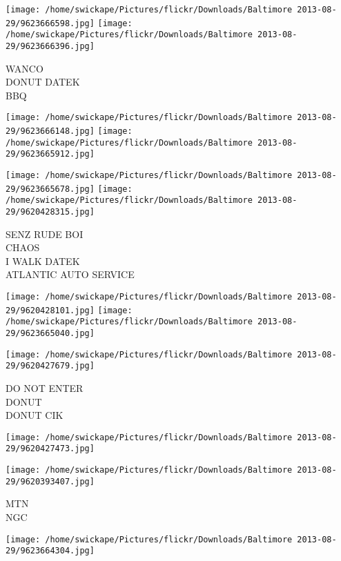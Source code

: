 \documentclass[10pt,letterpaper]{article}
\begin{document}
\vspace{0.25in}
\texttt{[image: /home/swickape/Pictures/flickr/Downloads/Baltimore 2013-08-29/9623666598.jpg]}
\texttt{[image: /home/swickape/Pictures/flickr/Downloads/Baltimore 2013-08-29/9623666396.jpg]}

WANCO\\
DONUT DATEK\\
BBQ\\
\pagebreak

\texttt{[image: /home/swickape/Pictures/flickr/Downloads/Baltimore 2013-08-29/9623666148.jpg]}
\texttt{[image: /home/swickape/Pictures/flickr/Downloads/Baltimore 2013-08-29/9623665912.jpg]}

\texttt{[image: /home/swickape/Pictures/flickr/Downloads/Baltimore 2013-08-29/9623665678.jpg]}
\texttt{[image: /home/swickape/Pictures/flickr/Downloads/Baltimore 2013-08-29/9620428315.jpg]}

SENZ RUDE BOI\\
CHAOS\\
I WALK  DATEK\\
ATLANTIC AUTO SERVICE\\
\pagebreak

\texttt{[image: /home/swickape/Pictures/flickr/Downloads/Baltimore 2013-08-29/9620428101.jpg]}
\texttt{[image: /home/swickape/Pictures/flickr/Downloads/Baltimore 2013-08-29/9623665040.jpg]}

\texttt{[image: /home/swickape/Pictures/flickr/Downloads/Baltimore 2013-08-29/9620427679.jpg]}

DO NOT ENTER\\
DONUT\\
DONUT CIK\\
\pagebreak

\texttt{[image: /home/swickape/Pictures/flickr/Downloads/Baltimore 2013-08-29/9620427473.jpg]}

\vspace{0.25in}
\texttt{[image: /home/swickape/Pictures/flickr/Downloads/Baltimore 2013-08-29/9620393407.jpg]}

MTN\\
NGC\\
\pagebreak

\texttt{[image: /home/swickape/Pictures/flickr/Downloads/Baltimore 2013-08-29/9623664304.jpg]}
\end{document}
